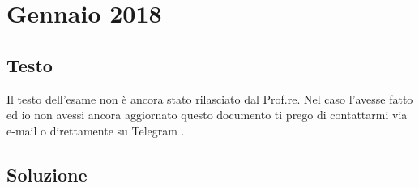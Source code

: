 \section{Gennaio 2018}

\subsection*{Testo}

Il testo dell'esame non è ancora stato rilasciato dal Prof.re. %
{\color{burgundy} Nel caso l'avesse fatto ed io non avessi ancora aggiornato questo documento ti prego di contattarmi via e-mail \href{mailto:emanuele.nardi@studenti.unitn.it}{\ExternalLink} o direttamente su Telegram \href{https://t.me/emanuelenardi}{\ExternalLink}.}

\subsection*{Soluzione}
